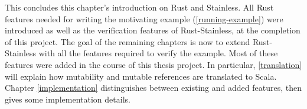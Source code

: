 \hfill \break \noindent This concludes this chapter's introduction on Rust and
Stainless. All Rust features needed for writing the motivating example
(\autoref{running-example}) were introduced as well as the verification features
of Rust-Stainless, at the completion of this project. The goal of the remaining
chapters is now to extend Rust-Stainless with all the features required to
verify the example. Most of these features were added in the course of this
thesis project. In particular, \autoref{translation} will explain how mutability
and mutable references are translated to Scala. Chapter \ref{implementation}
distinguishes between existing and added features, then gives some
implementation details.


